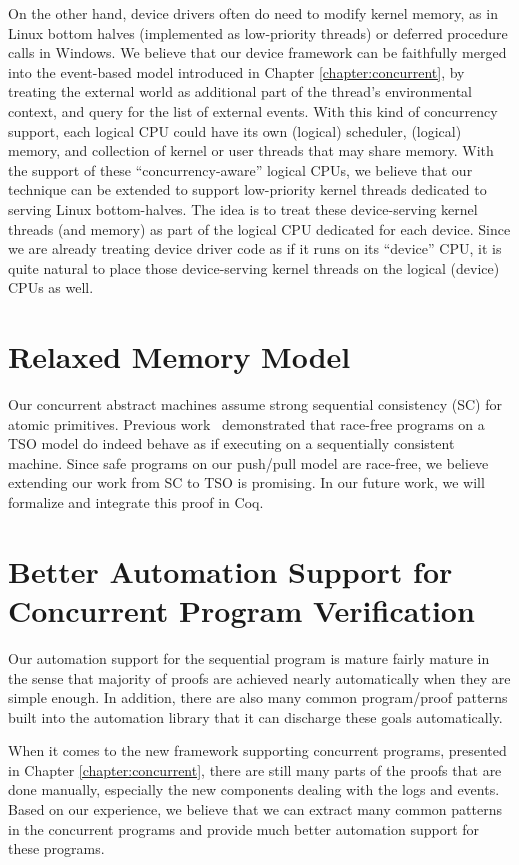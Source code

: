 On the other hand, device drivers often do need to modify kernel memory, as in Linux
bottom halves (implemented as low-priority threads) or deferred
procedure calls in Windows. We believe that our device framework
can be faithfully merged into the event-based model introduced in
Chapter \ref{chapter:concurrent}, by treating the external world as additional
part of the thread's environmental context, and query for the list of external
events. 
With this kind of concurrency support, each logical CPU could have
its own (logical) scheduler,
(logical) memory, and collection of kernel or user threads that may share memory.
With the support of these
``concurrency-aware'' logical CPUs, we believe that our technique can
be extended to support low-priority kernel threads dedicated to serving
Linux bottom-halves. The idea is to treat these device-serving kernel
threads (and memory) as part of the logical CPU dedicated for each
device. Since we are already treating device driver code as if it runs
on its ``device'' CPU, it is quite natural to place those
device-serving kernel threads on the logical (device) CPUs as well.

\section{Relaxed Memory Model}
Our concurrent abstract machines assume strong sequential consistency (SC)
for atomic primitives. 
Previous work~\cite{SewellSONM10} demonstrated that race-free programs on a TSO model do indeed behave as if executing on a
sequentially consistent machine. Since safe programs on our push/pull model are race-free, we believe extending our work from SC to TSO is promising. In our future work, we will formalize and integrate this proof in Coq.

\section{Better Automation Support for Concurrent Program Verification}
Our automation support for the sequential program is mature fairly mature
in the sense that majority of proofs are achieved nearly automatically
when they are simple enough. In addition, there are also many
common program/proof patterns built into the automation library that
it can discharge these goals automatically. 

When it comes to the new framework supporting concurrent programs, presented
in Chapter \ref{chapter:concurrent}, there are still many parts of the proofs
that are done manually, especially the new components dealing with the logs
and events. Based on our experience, we believe that we can extract
many common patterns in the concurrent programs and provide much better
automation support for these programs.


